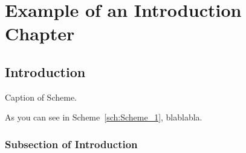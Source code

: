 \documentclass[main_brownies.tex]{subfiles}
\begin{document}
\graphicspath{ {Figures_Schemes/} } %

\setcounter{page}{0} %

\checkoddpage
\ifoddpage
	\newpage\thispagestyle{empty}
	\mbox{}
	\newpage
	
\else
	
\fi


\chapter[Example Introduction Chapter]{Example of an Introduction Chapter} %

\begin{abstract}
	\Blindtext[1][3]
\end{abstract}



\section{Introduction} \label{section_1_introduction}
\Blindtext[1][1]

\begin{scheme}[htb]
	\centering
	\caption{Caption of Scheme.}
	\label{sch:Scheme_1}
\end{scheme}

\FloatBarrier %

As you can see in Scheme~\ref{sch:Scheme_1}, blablabla.

\subsection{Subsection of Introduction} \label{section_1_1}
\Blindtext[1][1]
\end{document}
